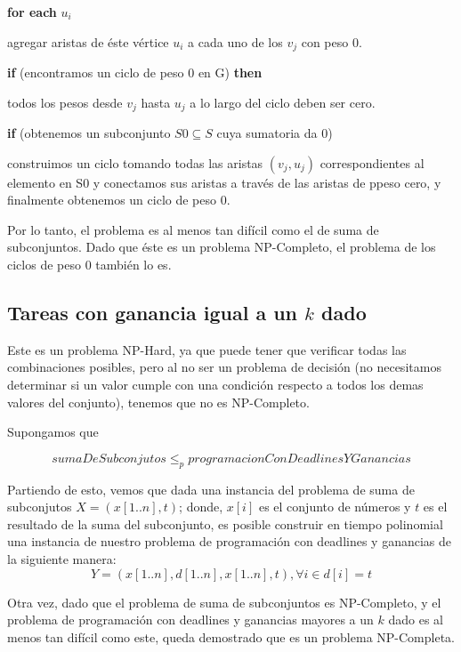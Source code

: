 \documentclass[a4paper,10pt]{article}
\begin{document}
\textbf{\textcolor[rgb]{0.0,0.5019608,0.0}{for each}} \( u_{i} \)

\quad agregar aristas de éste vértice \( u_{i} \) a cada uno de los \( v_{j} \) con peso 0. 

\textbf{\textcolor[rgb]{0.0,0.5019608,0.0}{if}} (encontramos un ciclo de peso 0 en G) \textbf{\textcolor[rgb]{0.0,0.5019608,0.0}{then}}

\quad todos los pesos desde \( v_{j} \) hasta \( u_{j} \) a lo largo del ciclo deben ser cero.
		
\textbf{\textcolor[rgb]{0.0,0.5019608,0.0}{if}} (obtenemos un subconjunto \( S0 \subseteq S \) cuya sumatoria da 0)

\quad construimos un ciclo tomando todas las aristas \( (v_{j}, u_{j}) \) correspondientes al elemento en S0 y conectamos sus aristas a través de las aristas de ppeso cero, y finalmente obtenemos un ciclo de peso 0.

\bigskip

Por lo tanto, el problema es al menos tan difícil como el de suma de subconjuntos. Dado que éste es un problema NP-Completo, el problema de los ciclos de peso 0 también lo es.

\subsection{Tareas con ganancia igual a un \(k\) dado}

Este es un problema NP-Hard, ya que puede tener que verificar todas las combinaciones posibles, pero al no ser un problema de decisión (no necesitamos determinar si un valor cumple con una condición respecto a todos los demas valores del conjunto), tenemos que no es NP-Completo.

Supongamos que

\[ sumaDeSubconjutos \le_{p} programacionConDeadlinesYGanancias \]

Partiendo de esto, vemos que dada una instancia del problema de suma de subconjutos \(X = (x[1..n], t)\); donde, \(x[i]\) es el conjunto de números y \(t\) es el resultado de la suma del subconjunto, es posible construir en tiempo polinomial una instancia de nuestro problema de programación con deadlines y ganancias de la siguiente manera: 
\[ Y = ( x[1..n], d[1..n], x[1..n], t ), \forall i \in d[i] = t \]

Otra vez, dado que el problema de suma de subconjuntos es NP-Completo, y el problema de programación con deadlines y ganancias mayores a un \(k\) dado es al menos tan difícil como este, queda demostrado que es un problema NP-Completa.
\end{document}
